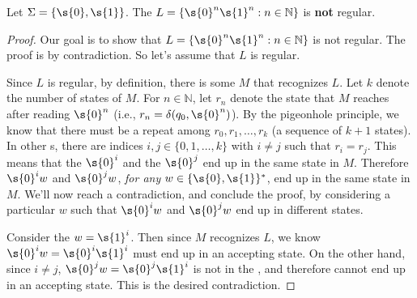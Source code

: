 



\begin{flex}
\begin{theorem} \label{theorem:0n1n-is-not-regular}
Let $\Sigma = \{\s{0},\s{1}\}$. The  $L = \{\s{0}^n \s{1}^n: n \in \mathbb{N}\}$ is \textbf{not} regular.
\end{theorem}

\begin{proof}
Our goal is to show that $L = \{\s{0}^n \s{1}^n: n \in \mathbb{N}\}$ is not regular. The proof is by contradiction. So let's assume that $L$ is regular. 

Since $L$ is regular, by definition, there is some  $M$ that recognizes $L$. Let $k$ denote the number of states of $M$. For $n \in \mathbb{N}$, let $r_n$ denote the state that $M$ reaches after reading $\s{0}^n$ (i.e., $r_n = \delta(q_0, \s{0}^n)$). By the pigeonhole principle, we know that there must be a repeat among $r_0, r_1,\ldots, r_k$ (a sequence of $k+1$ states). In other s, there are indices $i, j \in \{0,1,\ldots,k\}$ with $i \neq j$ such that $r_i = r_j$. This means that the  $\s{0}^i$ and the  $\s{0}^j$ end up in the same state in $M$. Therefore $\s{0}^iw$ and $\s{0}^jw$, \emph{for any}  $w \in \{\s{0},\s{1}\}^*$, end up in the same state in $M$. We'll now reach a contradiction, and conclude the proof, by considering a particular $w$ such that $\s{0}^iw$ and $\s{0}^jw$ end up in different states. 

Consider the  $w = \s{1}^i$. Then since $M$ recognizes $L$, we know $\s{0}^iw = \s{0}^i\s{1}^i$ must end up in an accepting state. On the other hand, since $i \neq j$, $\s{0}^jw = \s{0}^j\s{1}^i$ is not in the , and therefore cannot end up in an accepting state. This is the desired contradiction.
\end{proof}
\end{flex}


